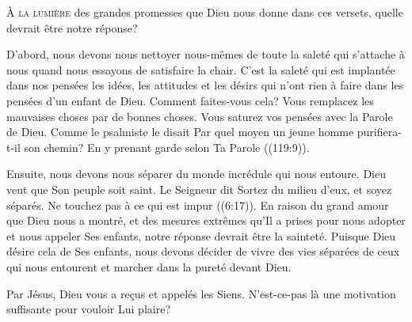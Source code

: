 


\lettrine{À}{ la lumière} des grandes promesses que Dieu nous donne
 dans ces versets, quelle devrait être notre réponse? 

D'abord, nous devons nous nettoyer nous-mêmes de toute la saleté
 qui s'attache à nous quand nous essayons de satisfaire la chair.
 C'est la saleté qui est implantée dans nos pensées
 \ocadr les idées, les attitudes et les désirs qui n'ont rien à faire
 dans les pensées d'un enfant de Dieu. Comment faites-vous cela?
 Vous remplacez les mauvaises choses par de bonnes choses.
 Vous saturez vos pensées avec la Parole de Dieu.
 Comme le psalmiste le disait\frcolon {}
 \Og Par quel moyen un jeune homme purifiera-t-il son chemin?
 En y prenant garde selon Ta Parole \Fg{} ((119:9)).


Ensuite, nous devons nous séparer du monde incrédule qui nous entoure.
 Dieu veut que Son peuple soit saint. Le Seigneur dit\frcolon {}
 \Og Sortez du milieu d’eux, et soyez séparés.
 Ne touchez pas à ce qui est impur \Fg{} ((6:17)).
 En raison du grand amour que Dieu nous a montré,
 et des mesures extrêmes qu'Il a prises pour nous adopter
 et nous appeler Ses enfants, notre réponse devrait être la sainteté.
 Puisque Dieu désire cela de Ses enfants, nous devons décider de vivre
 des vies séparées de ceux qui nous entourent et marcher dans la pureté
 devant Dieu.

Par Jésus, Dieu vous a re\c{c}us et appelés les Siens.
 N'est-ce-pas là une motivation suffisante pour vouloir Lui plaire?

\dvrule




